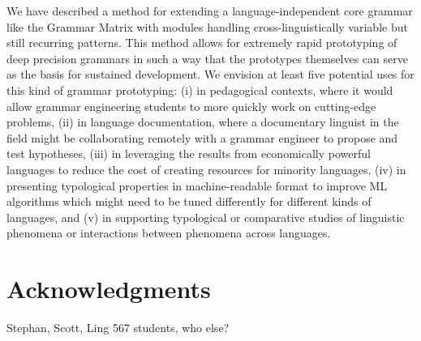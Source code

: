 \documentclass[11pt]{article}
\begin{document}
We have described a method for extending a language-independent core
grammar like the Grammar Matrix with modules handling
cross-linguistically variable but still recurring patterns.  This
method allows for extremely rapid prototyping of deep precision
grammars in such a way that the prototypes themselves can serve as the
basis for sustained development.  We envision at least five potential
uses for this kind of grammar prototyping: (i) in pedagogical
contexts, where it would allow grammar engineering students to more
quickly work on cutting-edge problems, (ii) in language documentation,
where a documentary linguist in the field might be collaborating
remotely with a grammar engineer to propose and test hypotheses, (iii)
in leveraging the results from economically powerful languages to
reduce the cost of creating resources for minority languages, (iv) in
presenting typological properties in machine-readable format to
improve ML algorithms which might need to be tuned differently for
different kinds of languages, and (v) in supporting typological or
comparative studies of linguistic phenomena or interactions between
phenomena across languages.

\section*{Acknowledgments}

Stephan, Scott, Ling 567 students, who else?


     
\end{document}
